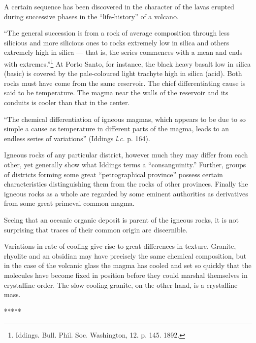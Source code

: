 \documentclass[a4paper, 12pt, oneside]{article}
\begin{document}
A certain sequence has been discovered in the character of the lavas erupted during successive phases in the ``life-history'' of a volcano.

``The general succession is from a rock of average composition through less silicious and more silicious ones to rocks extremely low in silica and others extremely high in silica --- that is, the series commences with a mean and ends with extremes.''\footnote{Iddings. Bull. Phil. Soc. Washington, 12. p. 145. 1892.} At Porto Santo, for instance, the black heavy basalt low in silica (basic) is covered by the pale-coloured light trachyte high in silica (acid). Both rocks must have come from the same reservoir. The chief differentiating cause is said to be temperature. The magma near the walls of the reservoir and its conduits is cooler than that in the center.

``The chemical differentiation of igneous magmas, which appears to be due to so simple a cause as temperature in different parts of the magma, leads to an endless series of variations'' (Iddings \emph{l.c.} p. 164).

Igneous rocks of any particular district, however much they may differ from each other, yet generally show what Iddings terms a ``consanguinity.'' Further, groups of districts forming some great ``petrographical province'' possess certain characteristics distinguishing them from the rocks of other provinces. Finally the igneous rocks as a whole are regarded by some eminent authorities as derivatives from some great primeval common magma.

Seeing that an oceanic organic deposit is parent of the igneous rocks, it is not surprising that traces of their common origin are discernible.

Variations in rate of cooling give rise to great differences in texture. Granite, rhyolite and an obsidian may have precisely the same chemical composition, but in the case of the volcanic glass the magma has cooled and set so quickly that the molecules have become fixed in position before they could marshal themselves in crystalline order. The slow-cooling granite, on the other hand, is a crystalline mass.

\centerline{*\hspace{15mm}*\hspace{15mm}*\hspace{15mm}*\hspace{15mm}*}
\bigskip
\end{document}
